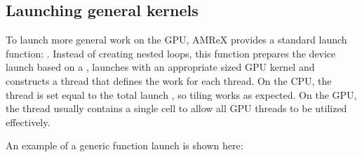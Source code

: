 \documentclass[letterpaper,10pt,english]{sphinxmanual}
\begin{document}
\subsection{Launching general kernels}
\label{\detokenize{GPU:launching-general-kernels}}
\sphinxAtStartPar
To launch more general work on the GPU, AMReX provides a standard launch function:
.  Instead of creating nested loops, this function
prepares the device launch based on a , launches with an appropriate sized
GPU kernel and constructs a thread  that defines the work for each thread.
On the CPU, the thread  is set equal to the total launch , so
tiling works as expected.  On the GPU, the thread  usually
contains a single cell to allow all GPU threads to be utilized effectively.

\sphinxAtStartPar
An example of a generic function launch is shown here:

\begin{sphinxVerbatim}[commandchars=\\\{\}]
    
        
        

    \PYG{p}{[}\PYG{p}{]}    
         
          
          

\end{sphinxVerbatim}
\end{document}
